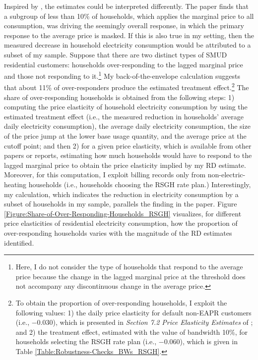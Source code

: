Inspired by \cite{Misunderstanding-Nonlinear-Prices_2020_(Shaffer)}, the estimates could be interpreted differently. The paper finds that a subgroup of less than 10\% of households, which applies the marginal price to all consumption, was driving the seemingly overall response, in which the primary response to the average price is masked. If this is also true in my setting, then the measured decrease in household electricity consumption would be attributed to a subset of my sample. Suppose that there are two distinct types of SMUD residential customers: households over-responding to the lagged marginal price and those not responding to it.\footnote{Here, I do not consider the type of households that respond to the average price because the change in the lagged marginal price at the threshold does not accompany any discontinuous change in the average price.} My back-of-the-envelope calculation suggests that about 11\% of over-responders produce the estimated treatment effect.\footnote{To obtain the proportion of over-responding households, I exploit the following values: 1) the daily price elasticity for default non-EAPR customers (i.e., $-0.030$), which is presented in \textit{Section 7.2 Price Elasticity Estimates} of \cite{SmartPricing-Options-Final-Evaluation_SMUD_2014}; and 2) the treatment effect, estimated with the value of bandwidth 10\%, for households selecting the RSGH rate plan (i.e., $-0.060$), which is given in Table \ref{Table:Robustness-Checks_BWs_RSGH}.} The share of over-responding households is obtained from the following steps: 1) computing the price elasticity of household electricity consumption by using the estimated treatment effect (i.e., the measured reduction in households' average daily electricity consumption), the average daily electricity consumption, the size of the price jump at the lower base usage quantity, and the average price at the cutoff point; and then 2) for a given price elasticity, which is available from other papers or reports, estimating how much households would have to respond to the lagged marginal price to obtain the price elasticity implied by my RD estimate. Moreover, for this computation, I exploit billing records only from non-electric-heating households (i.e., households choosing the RSGH rate plan.) Interestingly, my calculation, which indicates the reduction in electricity consumption by a subset of households in my sample, parallels the finding in the paper. Figure \ref{Figure:Share-of-Over-Responding-Households_RSGH} visualizes, for different price elasticities of residential electricity consumption, how the proportion of over-responding households varies with the magnitude of the RD estimates identified.  
